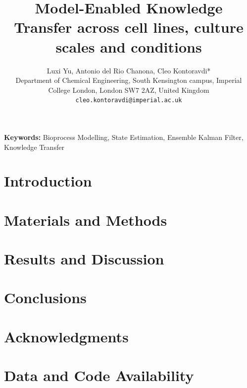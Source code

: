 \documentclass[10pt]{article}
\title{Model-Enabled Knowledge Transfer across cell lines, culture scales and conditions}
\author{Luxi Yu, Antonio del Rio Chanona, Cleo Kontoravdi*\\
\small Department of Chemical Engineering, South Kensington campus, Imperial College London, London SW7 2AZ, United Kingdom\\
\small \texttt{cleo.kontoravdi@imperial.ac.uk}}
\newcommand{\rev}[1]{{\fontfamily{ptm}\selectfont\color{blue}#1}}
\begin{document}
\date{}

\maketitle

\begin{abstract}

\end{abstract}

\textbf{Keywords:}  Bioprocess Modelling, State Estimation, Ensemble Kalman Filter, Knowledge Transfer

\section{Introduction}


\section{Materials and Methods}


\section{Results and Discussion}


\section{Conclusions}


\section{Acknowledgments}


\section{\rev{Data and Code Availability}}


\clearpage



\newpage
\appendix

\renewcommand{\thefigure}{S\arabic{figure}}
\setcounter{figure}{0}

\renewcommand{\thetable}{S\arabic{table}}
\setcounter{table}{0}
\end{document}
